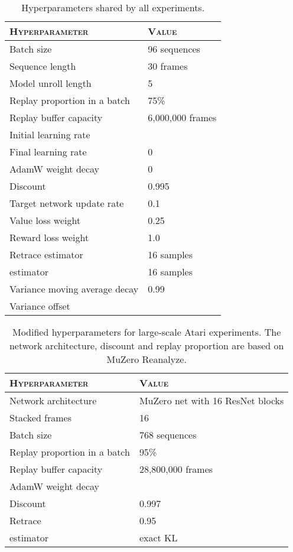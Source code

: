 \documentclass{article}
\begin{document}
\begin{table}[ht]
\caption{Hyperparameters shared by all experiments.}
\label{tab:common_hyperparams}
\vskip 0.1in
\begin{center}
\begin{small}
\begin{tabular}{ll}
\toprule
\textsc{Hyperparameter} & \textsc{Value} \\
\midrule
  Batch size & 96 sequences \\
  Sequence length & 30 frames \\
  Model unroll length  & 5 \\ 
  Replay proportion in a batch & 75\% \\
  Replay buffer capacity & 6,000,000 frames \\
  Initial learning rate &  \\
  Final learning rate & 0 \\
  AdamW weight decay & 0 \\
  Discount & 0.995 \\
  Target network update rate  & 0.1 \\
  Value loss weight & 0.25 \\
  Reward loss weight & 1.0 \\
  Retrace  estimator & 16 samples \\
   estimator & 16 samples \\
  Variance moving average decay  & 0.99 \\
  Variance offset  &  \\
\bottomrule
\end{tabular}
\end{small}
\end{center}
\vskip -0.1in
\end{table}


\begin{table}[ht]
\caption{Modified hyperparameters for large-scale Atari experiments. The network architecture, discount and replay proportion are based on MuZero Reanalyze.}
\label{tab:large_scale_hyperparams}
\begin{center}
\begin{small}
\begin{tabular}{ll}
\toprule
\textsc{Hyperparameter} & \textsc{Value} \\
\midrule
  Network architecture & MuZero net with 16 ResNet blocks \\
  Stacked frames & 16 \\
  Batch size & 768 sequences \\  Replay proportion in a batch & 95\% \\
  Replay buffer capacity & 28,800,000 frames \\
  AdamW weight decay &  \\
  Discount & 0.997 \\
  Retrace  & 0.95 \\
   estimator & exact KL \\
\bottomrule
\end{tabular}
\end{small}
\end{center}
\vskip -0.1in
\end{table}  
\end{document}
